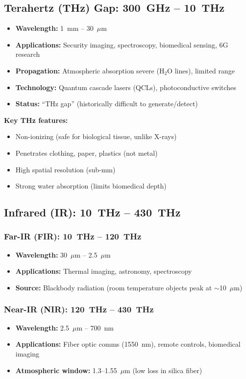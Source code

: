 \subsection{Terahertz (THz) Gap: 300~GHz -- 10~THz}

\begin{itemize}
\item \textbf{Wavelength:} 1~mm -- 30~$\mu$m
\item \textbf{Applications:} Security imaging, spectroscopy, biomedical sensing, 6G research
\item \textbf{Propagation:} Atmospheric absorption severe (H$_2$O lines), limited range
\item \textbf{Technology:} Quantum cascade lasers (QCLs), photoconductive switches
\item \textbf{Status:} ``THz gap'' (historically difficult to generate/detect)
\end{itemize}

\textbf{Key THz features:}
\begin{itemize}
\item Non-ionizing (safe for biological tissue, unlike X-rays)
\item Penetrates clothing, paper, plastics (not metal)
\item High spatial resolution (sub-mm)
\item Strong water absorption (limits biomedical depth)
\end{itemize}

\subsection{Infrared (IR): 10~THz -- 430~THz}

\subsubsection{Far-IR (FIR): 10~THz -- 120~THz}
\begin{itemize}
\item \textbf{Wavelength:} 30~$\mu$m -- 2.5~$\mu$m
\item \textbf{Applications:} Thermal imaging, astronomy, spectroscopy
\item \textbf{Source:} Blackbody radiation (room temperature objects peak at $\sim$10~$\mu$m)
\end{itemize}

\subsubsection{Near-IR (NIR): 120~THz -- 430~THz}
\begin{itemize}
\item \textbf{Wavelength:} 2.5~$\mu$m -- 700~nm
\item \textbf{Applications:} Fiber optic comms (1550~nm), remote controls, biomedical imaging
\item \textbf{Atmospheric window:} 1.3--1.55~$\mu$m (low loss in silica fiber)
\end{itemize}

